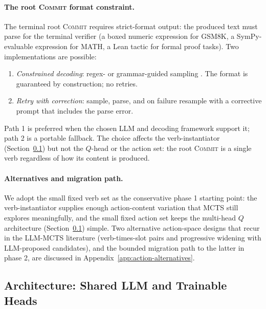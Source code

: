 \paragraph{The root \textsc{Commit} format constraint.}
The terminal root \textsc{Commit} requires strict-format output: the produced text
must parse for the terminal verifier (a boxed numeric expression for
GSM8K, a SymPy-evaluable expression for MATH, a Lean tactic for formal
proof tasks). Two implementations are possible:

\begin{enumerate}[leftmargin=*, itemsep=0.2em]
  \item \emph{Constrained decoding}: regex- or grammar-guided sampling
        \citep{willard2023outlines}. The format is guaranteed by
        construction; no retries.
  \item \emph{Retry with correction}: sample, parse, and on failure
        resample with a corrective prompt that includes the parse
        error.
\end{enumerate}

Path 1 is preferred when the chosen LLM and decoding framework support
it; path 2 is a portable fallback. The choice affects the
verb-instantiator (Section~\ref{sec:method-architecture}) but not the
$Q$-head or the action set: the root \textsc{Commit} is a single verb
regardless of how its content is produced.

\paragraph{Alternatives and migration path.}
We adopt the small fixed verb set as the conservative phase 1
starting point: the verb-instantiator supplies enough action-content
variation that MCTS still explores meaningfully, and the small fixed
action set keeps the multi-head $Q$ architecture
(Section~\ref{sec:method-architecture}) simple. Two alternative
action-space designs that recur in the LLM-MCTS literature (verb-times-slot
pairs and progressive widening with LLM-proposed candidates), and the
bounded migration path to the latter in phase 2, are discussed in
Appendix~\ref{app:action-alternatives}.

\subsection{Architecture: Shared LLM and Trainable Heads}
\label{sec:method-architecture}

